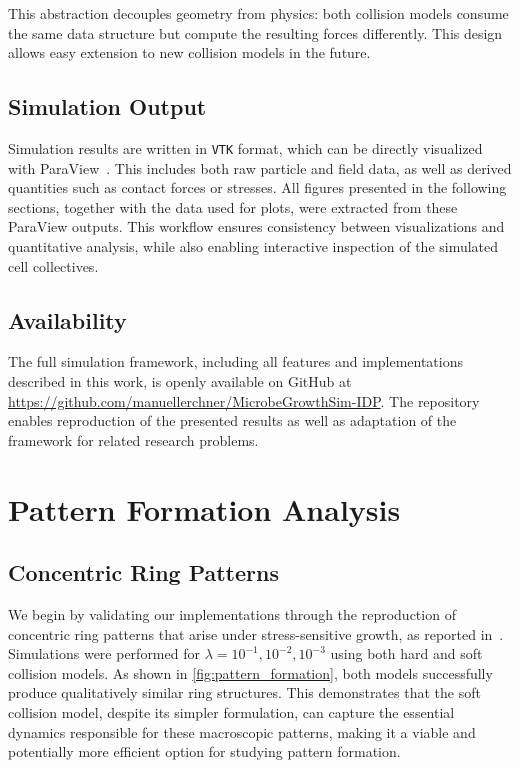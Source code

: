 \documentclass[conference]{IEEEtran}
\begin{document}
This abstraction decouples geometry from physics: both collision models consume the same data structure but compute the resulting forces differently. This design allows easy extension to new collision models in the future.

\subsection{Simulation Output}

Simulation results are written in \texttt{VTK} format, which can be directly visualized with ParaView~\cite{ahrens2005paraview}. This includes both raw particle and field data, as well as derived quantities such as contact forces or stresses.
All figures presented in the following sections, together with the data used for plots, were extracted from these ParaView outputs. This workflow ensures consistency between visualizations and quantitative analysis, while also enabling interactive inspection of the simulated cell collectives.


\subsection{Availability}

The full simulation framework, including all features and implementations described in this work, is openly available on GitHub at \url{https://github.com/manuellerchner/MicrobeGrowthSim-IDP}.
The repository enables reproduction of the presented results as well as adaptation of the framework for related research problems.

\section{Pattern Formation Analysis}

\subsection{Concentric Ring Patterns}

We begin by validating our implementations through the reproduction of concentric ring patterns that arise under stress-sensitive growth, as reported in~\cite{Weady2024}. Simulations were performed for $\lambda = 10^{-1}, 10^{-2}, 10^{-3}$ using both hard and soft collision models. As shown in \autoref{fig:pattern_formation}, both models successfully produce qualitatively similar ring structures. This demonstrates that the soft collision model, despite its simpler formulation, can capture the essential dynamics responsible for these macroscopic patterns, making it a viable and potentially more efficient option for studying pattern formation.
\end{document}
